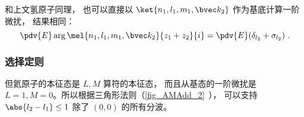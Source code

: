 和上文氢原子同理， 也可以直接以 $\ket{n_1, l_1, m_1, \bvec k_2}$ 作为基底计算一阶微扰， 结果相同：
\begin{equation}
\pdv{E} \arg\mel{n_1, l_1, m_1, \bvec k_2}{z_1 + z_2}{i} = \pdv{E} (\delta_{l_2} + \sigma_{l_2})~.
\end{equation}

\subsubsection{选择定则}
但氦原子的本征态是 $L,M$ 算符的本征态， 而且从基态的一阶微扰是 $L = 1, M = 0$。所以根据三角形法则（\autoref{fig_AMAdd_2}~）， 可以支持 $\abs{l_2 - l_1} \le 1$ 除了 $(0,0)$ 的所有分波。
